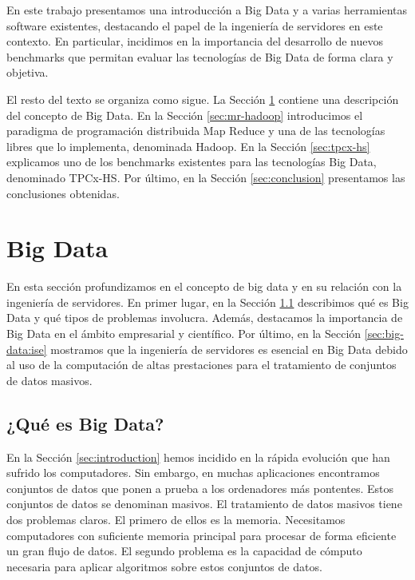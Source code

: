 \documentclass[10pt]{article}
\begin{document}
	En este trabajo presentamos una introducción a Big Data y a varias herramientas software existentes, destacando el papel de la ingeniería de servidores en este contexto. En particular, incidimos en la importancia del desarrollo de nuevos benchmarks que permitan evaluar las tecnologías de Big Data de forma clara y objetiva.

	El resto del texto se organiza como sigue. La Sección \ref{sec:big-data} contiene una descripción del concepto de Big Data. En la Sección \ref{sec:mr-hadoop} introducimos el paradigma de programación distribuida Map Reduce y una de las tecnologías libres que lo implementa, denominada Hadoop. En la Sección \ref{sec:tpcx-hs} explicamos uno de los benchmarks existentes para las tecnologías Big Data, denominado TPCx-HS. Por último, en la Sección \ref{sec:conclusion} presentamos las conclusiones obtenidas.

\section{Big Data} \label{sec:big-data}
	
	En esta sección profundizamos en el concepto de big data y en su relación con la ingeniería de servidores. En primer lugar, en la Sección \ref{sec:big-data:que-es} describimos qué es Big Data y qué tipos de problemas involucra. Además, destacamos la importancia de Big Data en el ámbito empresarial y científico. Por último, en la Sección \ref{sec:big-data:ise} mostramos que la ingeniería de servidores es esencial en Big Data debido al uso de la computación de altas prestaciones para el tratamiento de conjuntos de datos masivos.

	\subsection{¿Qué es Big Data?} \label{sec:big-data:que-es}
	
		En la Sección \ref{sec:introduction} hemos incidido en la rápida evolución que han sufrido los computadores. Sin embargo, en muchas aplicaciones encontramos conjuntos de datos que ponen a prueba a los ordenadores más pontentes. Estos conjuntos de datos se denominan masivos. El tratamiento de datos masivos tiene dos problemas claros. El primero de ellos es la memoria. Necesitamos computadores con suficiente memoria principal para procesar de forma eficiente un gran flujo de datos. El segundo problema es la capacidad de cómputo necesaria para aplicar algoritmos sobre estos conjuntos de datos. 
		
\end{document}
